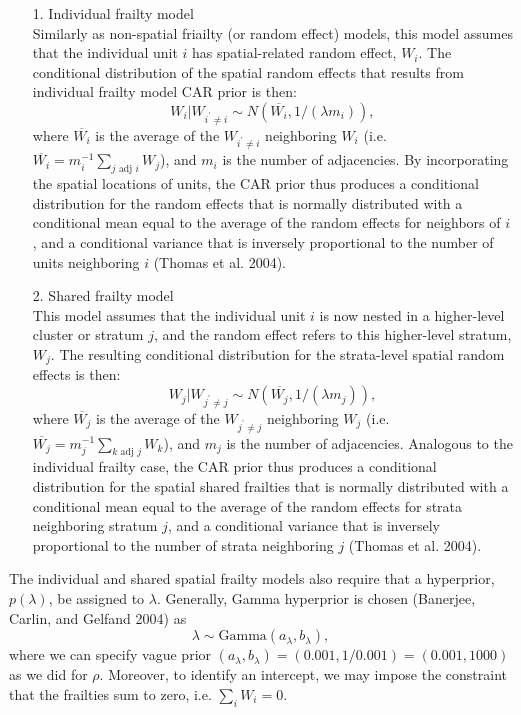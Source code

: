 \documentclass[a4paper, 12pt]{article}
\begin{document}
\begin{itemize}
	\item [1.] Individual frailty model\\
	Similarly as non-spatial friailty (or random effect) models, this model assumes that the individual unit $i$ has spatial-related random effect, $W_i$. The conditional distribution of the spatial random effects that results from individual frailty model CAR prior is then:
\begin{equation}
W_i|W_{i^\prime \neq i} \sim N(\overline{W_i}, 1/(\lambda m_i)),
\end{equation}
where $\overline{W_i}$ is the average of the $W_{i^\prime \neq i}$ neighboring $W_i$ (i.e. $\overline{W_i}=m_i^{-1}\sum_{j \mbox{ adj } i}W_j$), and $m_i$ is the number of adjacencies. By incorporating the spatial locations of units, the CAR prior thus produces a conditional
distribution for the random effects that is normally distributed with a conditional mean
equal to the average of the random effects for neighbors of $i$, and a conditional variance that
is inversely proportional to the number of units neighboring $i$ (Thomas et al. 2004).
	\item [2.] Shared frailty model\\
	This model assumes that the individual unit $i$ is now nested in a higher-level cluster or stratum	$j$, and the random effect refers to this higher-level stratum, $W_j$. The resulting conditional distribution for the strata-level spatial random effects is then:
	\begin{equation}
	W_j|W_{j^\prime \neq j} \sim N(\overline{W_j}, 1/(\lambda m_j)),
	\end{equation}
	where $\overline{W_j}$ is the average of the $W_{j^\prime \neq j}$ neighboring $W_j$ (i.e. $\overline{W_j}=m_j^{-1}\sum_{k \mbox{ adj } j}W_k$), and $m_j$ is the number of adjacencies. Analogous to the individual frailty case, the CAR prior thus produces a conditional distribution
for the spatial shared frailties that is normally distributed with a conditional mean
equal to the average of the random effects for strata neighboring stratum $j$, and a conditional
variance that is inversely proportional to the number of strata neighboring $j$ (Thomas et al.
2004).\\
\end{itemize} 
The individual and shared spatial frailty models also require that a hyperprior, $p(\lambda)$,
be assigned to $\lambda$. Generally, Gamma hyperprior is chosen (Banerjee, Carlin, and
Gelfand 2004) as
\begin{equation}
\lambda \sim \mbox{Gamma} (a_{\lambda}, b_{\lambda}),
\end{equation} where we can specify vague prior $(a_{\lambda}, b_{\lambda}) = (0.001, 1/0.001) = (0.001, 1000)$ as we did for $\rho$. Moreover, to identify an intercept, we may impose the constraint that the frailties sum to zero, i.e. $\sum_i W_i = 0$.
\newpage
\end{document}
